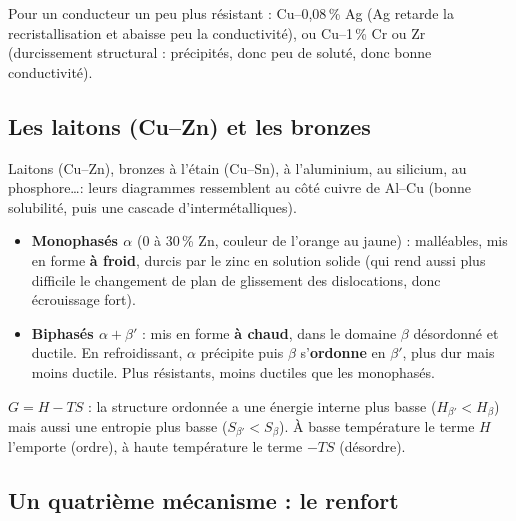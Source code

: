 Pour un conducteur un peu plus résistant : Cu--0,08\,\% Ag (Ag retarde la recristallisation et
abaisse peu la conductivité), ou Cu--1\,\% Cr ou Zr (durcissement structural : précipités, donc
peu de soluté, donc bonne conductivité).

\subsection*{Les laitons (Cu--Zn) et les bronzes}

Laitons (Cu--Zn), bronzes à l'étain (Cu--Sn), à l'aluminium, au silicium, au phosphore\ldots :
leurs diagrammes ressemblent au côté cuivre de Al--Cu (bonne solubilité, puis une cascade
d'intermétalliques).


\begin{propbox}[title={Laitons monophasés et biphasés}]
\begin{itemize}
  \item \textbf{Monophasés $\alpha$} (0 à 30\,\% Zn, couleur de l'orange au jaune) :
        malléables, mis en forme \textbf{à froid}, durcis par le zinc en solution solide (qui
        rend aussi plus difficile le changement de plan de glissement des dislocations, donc
        écrouissage fort).
  \item \textbf{Biphasés $\alpha + \beta'$} : mis en forme \textbf{à chaud}, dans le domaine
        $\beta$ désordonné et ductile. En refroidissant, $\alpha$ précipite puis $\beta$
        s'\textbf{ordonne} en $\beta'$, plus dur mais moins ductile. Plus résistants, moins
        ductiles que les monophasés.
\end{itemize}
\end{propbox}

\begin{rembox}[title={La mise en ordre $\beta \to \beta'$}]
$G = H - TS$ : la structure ordonnée a une énergie interne plus basse ($H_{\beta'} < H_\beta$)
mais aussi une entropie plus basse ($S_{\beta'} < S_\beta$). À basse température le terme $H$
l'emporte (ordre), à haute température le terme $-TS$ (désordre).
\end{rembox}

\subsection*{Un quatrième mécanisme : le renfort}

